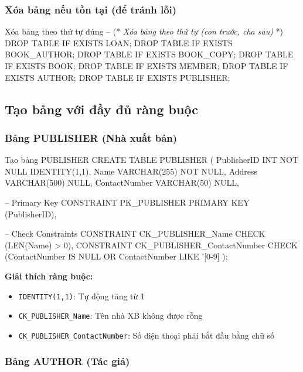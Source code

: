 \documentclass[12pt,a4paper]{article}
\newcommand{\vncomment}[1]{\textit{\color{green!50!black}#1}}
\begin{document}
\subsubsection{Xóa bảng nếu tồn tại (để tránh lỗi)}

\begin{sqlcode}{Xóa bảng theo thứ tự đúng}
-- (* \vncomment{Xóa bảng theo thứ tự (con trước, cha sau)} *)
DROP TABLE IF EXISTS LOAN;
DROP TABLE IF EXISTS BOOK_AUTHOR;
DROP TABLE IF EXISTS BOOK_COPY;
DROP TABLE IF EXISTS BOOK;
DROP TABLE IF EXISTS MEMBER;
DROP TABLE IF EXISTS AUTHOR;
DROP TABLE IF EXISTS PUBLISHER;
\end{sqlcode}

\subsection{Tạo bảng với đầy đủ ràng buộc}

\subsubsection{Bảng PUBLISHER (Nhà xuất bản)}

\begin{sqlcode}{Tạo bảng PUBLISHER}
CREATE TABLE PUBLISHER (
    PublisherID      INT            NOT NULL   IDENTITY(1,1),
    Name             VARCHAR(255)   NOT NULL,
    Address          VARCHAR(500)   NULL,
    ContactNumber    VARCHAR(50)    NULL,

    -- Primary Key
    CONSTRAINT PK_PUBLISHER PRIMARY KEY (PublisherID),

    -- Check Constraints
    CONSTRAINT CK_PUBLISHER_Name
        CHECK (LEN(Name) > 0),
    CONSTRAINT CK_PUBLISHER_ContactNumber
        CHECK (ContactNumber IS NULL OR ContactNumber LIKE '[0-9]%
);
\end{sqlcode}

\textbf{Giải thích ràng buộc:}
\begin{itemize}
    \item \texttt{IDENTITY(1,1)}: Tự động tăng từ 1
    \item \texttt{CK\_PUBLISHER\_Name}: Tên nhà XB không được rỗng
    \item \texttt{CK\_PUBLISHER\_ContactNumber}: Số điện thoại phải bắt đầu bằng chữ số
\end{itemize}

\subsubsection{Bảng AUTHOR (Tác giả)}
\end{document}
